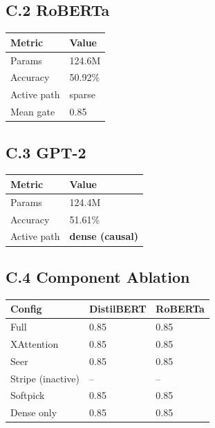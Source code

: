\subsection{C.2 RoBERTa}

\begin{table}[H]
\centering
\small
\begin{tabular}{ll}
\toprule
\textbf{Metric} & \textbf{Value} \\
\midrule
Params & 124.6M \\
Accuracy & 50.92\% \\
Active path & sparse \\
Mean gate & 0.85 \\
\bottomrule
\end{tabular}
\end{table}

\subsection{C.3 GPT-2}

\begin{table}[H]
\centering
\small
\begin{tabular}{ll}
\toprule
\textbf{Metric} & \textbf{Value} \\
\midrule
Params & 124.4M \\
Accuracy & 51.61\% \\
Active path & \textbf{dense (causal)} \\
\bottomrule
\end{tabular}
\end{table}

\subsection{C.4 Component Ablation}

\begin{table}[H]
\centering
\small
\begin{tabular}{lll}
\toprule
\textbf{Config} & \textbf{DistilBERT} & \textbf{RoBERTa} \\
\midrule
Full & 0.85 & 0.85 \\
XAttention & 0.85 & 0.85 \\
Seer & 0.85 & 0.85 \\
Stripe (inactive) & -- & -- \\
Softpick & 0.85 & 0.85 \\
Dense only & 0.85 & 0.85 \\
\bottomrule
\end{tabular}
\end{table}

